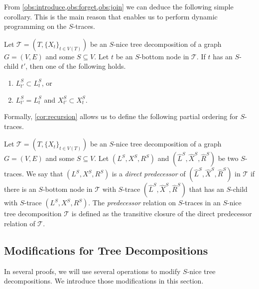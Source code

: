 \documentclass[a4paper,UKenglish,cleveref, autoref, thm-restate, numberwithinsect]{lipics-v2021}
\newcounter{modification}
\begin{document}
From \cref{obs:introduce,obs:forget,obs:join} we can deduce the following simple corollary. This is the main reason that enables us to perform dynamic programming on the $S$-traces.

\begin{corollary}\label{cor:recursion}
    Let $\mathcal{T}=(T,\{X_t\}_{t\in V(T)})$ be an $S$-nice tree decomposition of a graph $G=(V,E)$ and some $S\subseteq V$. Let $t$ be an $S$-bottom node in $\mathcal{T}$. If $t$ has an $S$-child $t'$, then one of the following holds.
    \begin{enumerate}
        \item $L_{t'}^S\subset L_t^S$, or
        \item $L_{t'}^S = L_t^S$ and $X_{t'}^S\subset X_t^S$.
    \end{enumerate}
\end{corollary}

Formally, \cref{cor:recursion} allows us to define the following partial ordering for $S$-traces.
\begin{definition}\label{def:predecingstraces}
Let $\mathcal{T}=(T,\{X_t\}_{t\in V(T)})$ be an $S$-nice tree decomposition of a graph $G=(V,E)$ and some $S\subseteq V$. Let $(L^S,X^S,R^S)$ and $(\hat{L}^S,\hat{X}^S,\hat{R}^S)$ be two $S$-traces. We say that $(L^S,X^S,R^S)$ is a \emph{direct predecessor} of $(\hat{L}^S,\hat{X}^S,\hat{R}^S)$ in $\mathcal{T}$ if there is an $S$-bottom node in $\mathcal{T}$ with $S$-trace $(\hat{L}^S,\hat{X}^S,\hat{R}^S)$ that has an $S$-child with $S$-trace $(L^S,X^S,R^S)$. The \emph{predecessor} relation on $S$-traces in an $S$-nice tree decomposition $\mathcal{T}$ is defined as the transitive closure of the direct predecessor relation of $\mathcal{T}$.
\end{definition}


\subsection{Modifications for Tree Decompositions}
\label{sec:mod}


In several proofs, we will use several operations to modify $S$-nice tree decompositions. We introduce those modifications in this section. 
\end{document}
